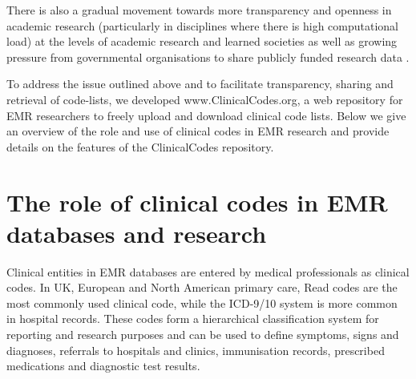 \documentclass[10pt]{article}
\begin{document}
There is also a gradual movement towards more transparency and openness in academic research (particularly in disciplines where there is high computational load) at the levels of academic research \cite{Bechhofer2013, Stodden2013, Pampel2013} and learned societies \cite{RoyalSoc2012} as well as growing pressure from governmental organisations to share publicly funded research data \cite{EuropeanCommission2012, OfficeSciTech2013}.

To address the issue outlined above and to facilitate transparency, sharing and retrieval of code-lists, we developed www.ClinicalCodes.org, a web repository for EMR researchers to freely upload and download clinical code lists.  Below we give an overview of the role and use of clinical codes in EMR research and provide details on the features of the ClinicalCodes repository.


\section*{The role of clinical codes in EMR databases and research}


Clinical entities in EMR databases are entered by medical professionals as clinical codes.  In UK, European and North American primary care, Read codes are the most commonly used clinical code, while the ICD-9/10 system is more common in hospital records.  These codes form a hierarchical classification system for reporting and research purposes and can be used to define symptoms, signs and diagnoses, referrals to hospitals and clinics, immunisation records, prescribed medications and diagnostic test results.
\end{document}
